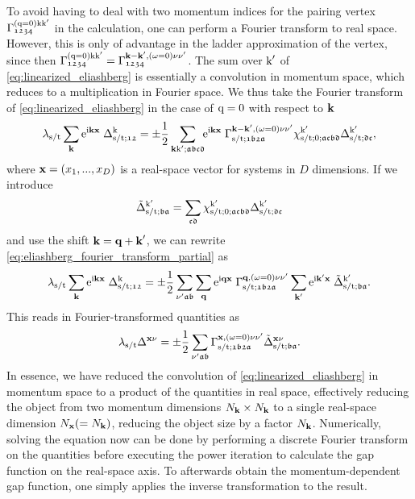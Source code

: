 \documentclass[../../main.tex]{subfiles}
\begin{document}
To avoid having to deal with two momentum indices for the pairing vertex $\Gamma_{\mathfrak{1234}}^{(\text{q}=0)\text{k}\text{k}'}$ in the calculation, one can perform a Fourier transform to real space. However, this is only of advantage in the ladder approximation of the vertex, since then $\Gamma_{\mathfrak{1234}}^{(\text{q}=0)\text{k}\text{k}'}=\Gamma_{\mathfrak{1234}}^{\textbf{k}-\textbf{k}',(\omega=0)\nu\nu'}$. The sum over $\text{k}'$ of \eqref{eq:linearized_eliashberg} is essentially a convolution in momentum space, which reduces to a multiplication in Fourier space. We thus take the Fourier transform of \eqref{eq:linearized_eliashberg} in the case of $\text{q}=0$ with respect to $\textbf{k}$
\begin{align}\label{eq:eliashberg_fourier_transform_partial}
	\lambda_{\text{s}/\text{t}}\sum_{\textbf{k}}\mathrm{e}^{\mathrm{i}\textbf{kx}}\;\Delta_{\text{s}/\text{t};\mathfrak{12}}^{\text{k}}=\pm\frac{1}{2}\sum_{\textbf{k}\text{k}';\mathfrak{abcd}}\!\!\mathrm{e}^{\mathrm{i}\textbf{kx}}\;\Gamma^{\textbf{k}-\textbf{k}',(\omega=0)\nu\nu'}_{\text{s}/\text{t};\mathfrak{1b2a}}\chi^{\text{k}'}_{\text{s}/\text{t};0;\mathfrak{acbd}}\Delta_{\text{s}/\text{t};\mathfrak{dc}}^{\text{k}'},
\end{align}
where $\textbf{x}=(x_1,...,x_D)$ is a real-space vector for systems in $D$ dimensions. If we introduce
\begin{align}
	\tilde\Delta^{\text{k}'}_{\text{s}/\text{t};\mathfrak{ba}}=\sum_{\mathfrak{cd}}\chi^{\text{k}'}_{\text{s}/\text{t};0;\mathfrak{acbd}}\Delta_{\text{s}/\text{t};\mathfrak{dc}}^{\text{k}'}
\end{align}
and use the shift $\textbf{k}=\textbf{q}+\textbf{k}'$, we can rewrite \eqref{eq:eliashberg_fourier_transform_partial} as
\begin{align}
	\lambda_{\text{s}/\text{t}}\sum_{\textbf{k}}\mathrm{e}^{\mathrm{i}\textbf{kx}}\; \Delta_{\text{s}/\text{t};\mathfrak{12}}^{\text{k}}=\pm\frac12\sum_{\nu'\mathfrak{ab}}\sum_{\textbf{q}}\mathrm{e}^{\mathrm{i}\textbf{qx}}\;\Gamma^{\textbf{q},(\omega=0)\nu\nu'}_{\text{s}/\text{t};\mathfrak{1b2a}}\sum_{\textbf{k}'}\mathrm{e}^{\mathrm{i}\textbf{k}'\textbf{x}}\;\tilde\Delta^{\text{k}'}_{\text{s}/\text{t};\mathfrak{ba}}.
\end{align}
This reads in Fourier-transformed quantities as
\begin{align}
	\lambda_{\text{s}/\text{t}} \Delta^{\textbf{x}\nu}=\pm\frac12\sum_{\nu'\mathfrak{ab}}\Gamma^{\textbf{x},(\omega=0)\nu\nu'}_{\text{s}/\text{t};\mathfrak{1b2a}}\tilde\Delta^{\textbf{x}\nu}_{\text{s}/\text{t};\mathfrak{ba}}.
\end{align}
In essence, we have reduced the convolution of \eqref{eq:linearized_eliashberg} in momentum space to a product of the quantities in real space, effectively reducing the object from two momentum dimensions $N_{\textbf{k}}\times N_{\textbf{k}}$ to a single real-space dimension $N_{\textbf{x}}(=N_{\textbf{k}})$, reducing the object size by a factor $N_{\textbf{k}}$. Numerically, solving the equation now can be done by performing a discrete Fourier transform on the quantities before executing the power iteration to calculate the gap function on the real-space axis. To afterwards obtain the momentum-dependent gap function, one simply applies the inverse transformation to the result.
\end{document}
